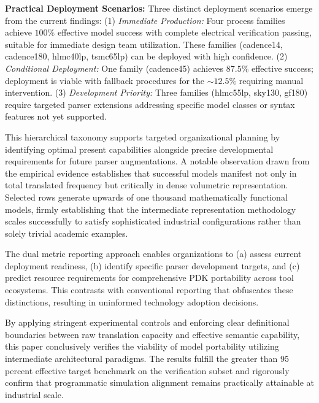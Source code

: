\documentclass[10pt,twocolumn]{article}
\begin{document}
\textbf{Practical Deployment Scenarios:} Three distinct deployment scenarios emerge from the current findings: (1) \textit{Immediate Production:} Four process families achieve $100\%$ effective model success with complete electrical verification passing, suitable for immediate design team utilization. These families (cadence14, cadence180, hlmc40lp, tsmc65lp) can be deployed with high confidence. (2) \textit{Conditional Deployment:} One family (cadence45) achieves $87.5\%$ effective success; deployment is viable with fallback procedures for the $\sim 12.5\%$ requiring manual intervention. (3) \textit{Development Priority:} Three families (hlmc55lp, sky130, gf180) require targeted parser extensions addressing specific model classes or syntax features not yet supported.

This hierarchical taxonomy supports targeted organizational planning by identifying optimal present capabilities alongside precise developmental requirements for future parser augmentations. A notable observation drawn from the empirical evidence establishes that successful models manifest not only in total translated frequency but critically in dense volumetric representation. Selected rows generate upwards of one thousand mathematically functional models, firmly establishing that the intermediate representation methodology scales successfully to satisfy sophisticated industrial configurations rather than solely trivial academic examples. 

The dual metric reporting approach enables organizations to (a) assess current deployment readiness, (b) identify specific parser development targets, and (c) predict resource requirements for comprehensive PDK portability across tool ecosystems. This contrasts with conventional reporting that obfuscates these distinctions, resulting in uninformed technology adoption decisions.

By applying stringent experimental controls and enforcing clear definitional boundaries between raw translation capacity and effective semantic capability, this paper conclusively verifies the viability of model portability utilizing intermediate architectural paradigms. The results fulfill the greater than 95 percent effective target benchmark on the verification subset and rigorously confirm that programmatic simulation alignment remains practically attainable at industrial scale.
\end{document}
